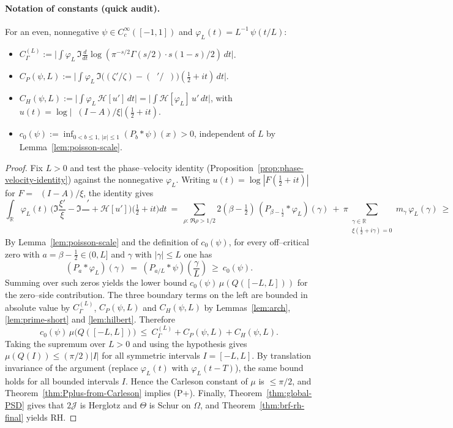 \documentclass[11pt]{article}
\theoremstyle{definition}
\theoremstyle{remark}
\newcommand{\R}{\mathbb{R}}
\newcommand{\Poisson}{P}
\DeclareMathOperator{\dettwo}{det_2}
\begin{document}
\paragraph{Notation of constants (quick audit).}
For an even, nonnegative \(\psi\in C_c^\infty([-1,1])\) and \(\varphi_L(t)=L^{-1}\,\psi(t/L)\):
\begin{itemize}
  \item \(C_\Gamma^{(L)}:=\big|\int \varphi_L\,\Im\tfrac{d}{dt}\log(\pi^{-s/2}\Gamma(s/2)\cdot s(1-s)/2)\,dt\big|\).
  \item \(C_P(\psi,L):=\big|\int \varphi_L\,\Im\big((\zeta'/\zeta)-(\dettwo'/\dettwo)\big)(\tfrac12+it)\,dt\big|\).
  \item \(C_H(\psi,L):=\big|\int \varphi_L\,\mathcal H[u']\,dt\big|=\big|\int \mathcal H[\varphi_L]\,u'\,dt\big|\), with \(u(t)=\log|\dettwo(I-A)/\xi|(\tfrac12+it)\).
  \item \(c_0(\psi):=\inf_{0<b\le 1,\,|x|\le 1}(\Poisson_b*\psi)(x)>0\), independent of \(L\) by Lemma~\ref{lem:poisson-scale}.
\end{itemize}

\begin{proof}
Fix $L>0$ and test the phase–velocity identity (Proposition~\ref{prop:phase-velocity-identity}) against the nonnegative $\varphi_L$. Writing $u(t)=\log|F(\tfrac12+it)|$ for $F=\dettwo(I-A)/\xi$, the identity gives
\[
 \int_\R \varphi_L(t)\,\Big(\Im\frac{\xi'}{\xi}-\Im\frac{\dettwo'}{\dettwo}+\mathcal H[u']\Big)\!\Big(\tfrac12+it\Big)dt
 \ =\ \sum_{\rho:\,\Re\rho>1/2} 2(\beta-\tfrac12)\,(\Poisson_{\beta-\frac12}*\varphi_L)(\gamma)
 \ +\ \pi\sum_{\substack{\gamma\in\R\\ \xi(\frac12+i\gamma)=0}} m_\gamma\,\varphi_L(\gamma)\ \ge\ 0.
\]
By Lemma~\ref{lem:poisson-scale} and the definition of $c_0(\psi)$, for every off–critical zero with $a=\beta-\tfrac12\in(0,L]$ and $\gamma$ with $|\gamma|\le L$ one has
\[
  (\Poisson_{a}*\varphi_L)(\gamma)\ =\ (\Poisson_{a/L}*\psi)\!\left(\frac{\gamma}{L}\right)\ \ge\ c_0(\psi).
\]
Summing over such zeros yields the lower bound $c_0(\psi)\,\mu(Q([-L,L]))$ for the zero–side contribution. The three boundary terms on the left are bounded in absolute value by $C_\Gamma^{(L)}$, $C_P(\psi,L)$ and $C_H(\psi,L)$ by Lemmas~\ref{lem:arch}, \ref{lem:prime-short} and \ref{lem:hilbert}. Therefore
\[
  c_0(\psi)\,\mu\big(Q([-L,L])\big)\ \le\ C_\Gamma^{(L)}+C_P(\psi,L)+C_H(\psi,L).
\]
Taking the supremum over $L>0$ and using the hypothesis gives $\mu(Q(I))\le (\pi/2)|I|$ for all symmetric intervals $I=[-L,L]$. By translation invariance of the argument (replace $\varphi_L(t)$ with $\varphi_L(t-T)$), the same bound holds for all bounded intervals $I$. Hence the Carleson constant of $\mu$ is $\le \pi/2$, and Theorem~\ref{thm:Pplus-from-Carleson} implies (P+). Finally, Theorem~\ref{thm:global-PSD} gives that $2\mathcal J$ is Herglotz and $\Theta$ is Schur on $\Omega$, and Theorem~\ref{thm:brf-rh-final} yields RH.
\end{proof}
\end{document}

